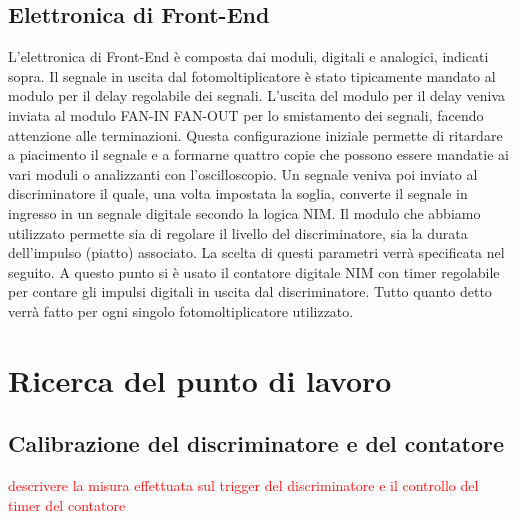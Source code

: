 \documentclass[a4paper,10pt]{article}
\newcommand{\note}[1]{\textcolor{red}{#1}}
\begin{document}
\subsection{Elettronica di Front-End}
L'elettronica di Front-End è composta dai moduli, digitali e analogici, indicati sopra. Il segnale in uscita dal fotomoltiplicatore è stato tipicamente mandato al modulo per il delay regolabile dei segnali. L'uscita del modulo per il delay veniva inviata al modulo FAN-IN FAN-OUT per lo smistamento dei segnali, facendo attenzione alle terminazioni. Questa configurazione iniziale permette di ritardare a piacimento il segnale e a formarne quattro copie che possono essere mandatie ai vari moduli o analizzanti con l'oscilloscopio. Un segnale veniva poi inviato al discriminatore il quale, una volta impostata la soglia, converte il segnale in ingresso in un segnale digitale secondo la logica NIM. Il modulo che abbiamo utilizzato permette sia di regolare il livello del discriminatore, sia la durata dell'impulso (piatto) associato. La scelta di questi parametri verrà specificata nel seguito. A questo punto si è usato il contatore digitale NIM con timer regolabile per contare gli impulsi digitali in uscita dal discriminatore. Tutto quanto detto verrà fatto per ogni singolo fotomoltiplicatore utilizzato. 







\section{Ricerca del punto di lavoro}
\label{sec:puntodilavoro} 
\subsection{Calibrazione del discriminatore e del contatore}
\note{descrivere la misura effettuata sul trigger del discriminatore e il controllo del timer del contatore}
\end{document}

